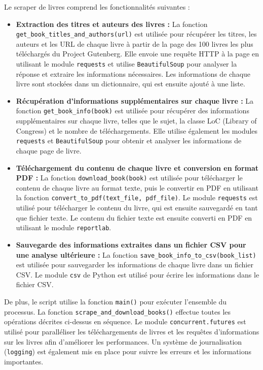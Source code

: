 \sloppy

Le scraper de livres comprend les fonctionnalités suivantes :

\begin{itemize}
    \item \textbf{Extraction des titres et auteurs des livres :} La fonction \texttt{get\_book\_titles\_and\_authors(url)} est utilisée pour récupérer les titres, les auteurs et les URL de chaque livre à partir de la page des 100 livres les plus téléchargés du Project Gutenberg. Elle envoie une requête HTTP à la page en utilisant le module \texttt{requests} et utilise \texttt{BeautifulSoup} pour analyser la réponse et extraire les informations nécessaires. Les informations de chaque livre sont stockées dans un dictionnaire, qui est ensuite ajouté à une liste.

    \item \textbf{Récupération d'informations supplémentaires sur chaque livre :} La fonction \texttt{get\_book\_info(book)} est utilisée pour récupérer des informations supplémentaires sur chaque livre, telles que le sujet, la classe LoC (Library of Congress) et le nombre de téléchargements. Elle utilise également les modules \texttt{requests} et \texttt{BeautifulSoup} pour obtenir et analyser les informations de chaque page de livre.

    \item \textbf{Téléchargement du contenu de chaque livre et conversion en format PDF :} La fonction \texttt{download\_book(book)} est utilisée pour télécharger le contenu de chaque livre au format texte, puis le convertir en PDF en utilisant la fonction \texttt{convert\_to\_pdf(text\_file, pdf\_file)}. Le module \texttt{requests} est utilisé pour télécharger le contenu du livre, qui est ensuite sauvegardé en tant que fichier texte. Le contenu du fichier texte est ensuite converti en PDF en utilisant le module \texttt{reportlab}.
    
    \item \textbf{Sauvegarde des informations extraites dans un fichier CSV pour une analyse ultérieure :} La fonction \texttt{save\_book\_info\_to\_csv(book\_list)} est utilisée pour sauvegarder les informations de chaque livre dans un fichier CSV. Le module \texttt{csv} de Python est utilisé pour écrire les informations dans le fichier CSV.
\end{itemize}

De plus, le script utilise la fonction \texttt{main()} pour exécuter l'ensemble du processus. La fonction \texttt{scrape\_and\_download\_books()} effectue toutes les opérations décrites ci-dessus en séquence. Le module \texttt{concurrent.futures} est utilisé pour paralléliser les téléchargements de livres et les requêtes d'informations sur les livres afin d'améliorer les performances. Un système de journalisation (\texttt{logging}) est également mis en place pour suivre les erreurs et les informations importantes.

